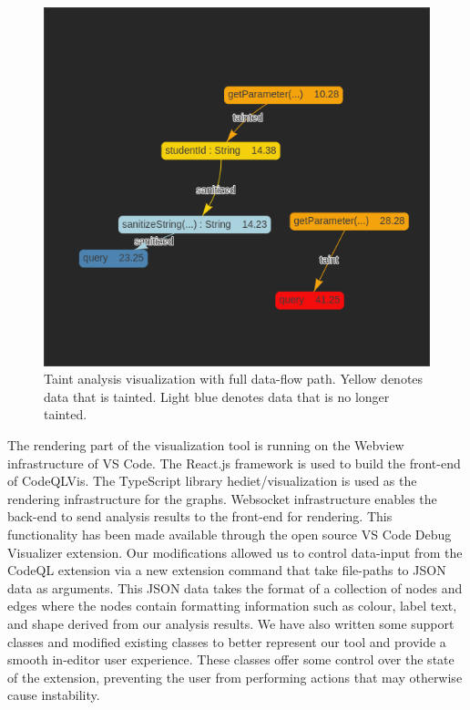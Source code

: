 \documentclass[sigplan,10pt,review]{acmart}
\begin{document}
\begin{figure}[h]
  \centering
  \includegraphics[width=\linewidth]{taint_full}
  \caption{Taint analysis visualization with full data-flow path. Yellow denotes data that is tainted. Light blue denotes data that is no longer tainted.}
\end{figure}

The rendering part of the visualization tool is running on the Webview infrastructure of VS Code. The React.js framework is used to build the front-end of CodeQLVis. The TypeScript library hediet/visualization is used as the rendering infrastructure for the graphs. Websocket infrastructure enables the back-end to send analysis results to the front-end for rendering.
\newline
\indent This functionality has been made available through the open source VS Code Debug Visualizer extension. Our modifications allowed us to control data-input from the CodeQL extension via a new extension command that take file-paths to JSON data as arguments. This JSON data takes the format of a collection of nodes and edges where the nodes contain formatting information such as colour, label text, and shape derived from our analysis results.
\newline
\indent We have also written some support classes and modified existing classes to better represent our tool and provide a smooth in-editor user experience. These classes offer some control over the state of the extension, preventing the user from performing actions that may otherwise cause instability.
\end{document}
